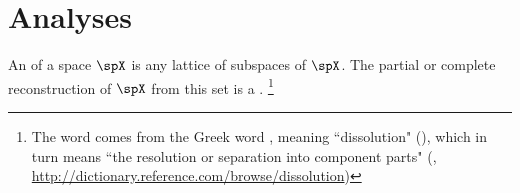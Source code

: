 

\section{Analyses}
An  of a space $\spX$ is any lattice of subspaces of $\spX$.
        The partial or complete reconstruction of $\spX$ from this set is a .%
\footnote{%
  The word  comes from the Greek word
  {},
  meaning ``dissolution" (),
  which in turn means
  ``the resolution or separation into component parts"
  (, \scs\url{http://dictionary.reference.com/browse/dissolution})
  }

